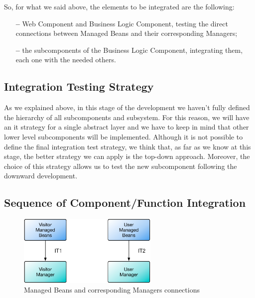 So, for what we said above, the elements to be integrated are the following:

\begin{itemize}

\item[\textbf{--}] Web Component and Business Logic Component, testing the  direct connections between Managed Beans and their corresponding Managers;

\item[\textbf{--}] the subcomponents of the Business Logic Component, integrating them, each one with the needed others.

\end{itemize}

\subsection{Integration Testing Strategy}
As we explained above, in this stage of the development we haven't fully defined the hierarchy of all subcomponents and subsystem.
For this reason, we will have an \acl{it} strategy for a single abstract layer and we have to keep in mind that other lower level subcomponents will be implemented.
Although it is not possible to define the final integration test strategy, we think that, as far as we know at this stage, the better strategy we can apply is the top-down approach.
Moreover, the choice of this strategy allows us to test the new subcomponent following the downward development.

\subsection{Sequence of Component/Function Integration}

\vspace{40pt}

\begin{figure}[htbp]
\centering
\includegraphics[width=0.6\textwidth]{Images/IT1-2.pdf}
\vspace{16pt}
\caption{Managed Beans and corresponding Managers connections}
\label{fig:it1-2}
\end{figure}

